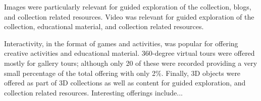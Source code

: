 \documentclass{egpubl}
\begin{document}
Images were particularly relevant for guided exploration of the collection, blogs, and collection related resources. Video was relevant for guided exploration of the collection, educational material, and  collection related resources. 

Interactivity, in the format of games and activities, was popular for offering creative activities and educational material. 360-degree virtual tours were offered mostly for gallery tours; although only 20 of these were recorded providing a very small percentage of the total offering with only 2\%. Finally, 3D objects were offered as part of 3D collections  as well as content for guided exploration, and collection related resources. Interesting offerings include... 
\end{document}
